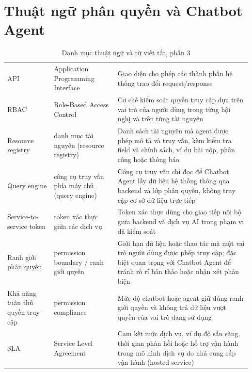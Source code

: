 \pagebreak

\section*{Thuật ngữ phân quyền và Chatbot Agent}

\begingroup
\setlength{\tabcolsep}{2pt}
\renewcommand{\arraystretch}{1.2}
\begin{longtable}{|C{0.16\textwidth}|P{0.22\textwidth}|P{0.55\textwidth}|}  \caption{Danh mục thuật ngữ và từ viết tắt, phần 3}\\
  \hline
       &        &     \\ \hline
  API     &     Application Programming Interface     &     Giao diện cho phép các thành phần hệ thống trao đổi request/response \\ \hline
  RBAC     &     Role-\allowbreak Based Access Control     &     Cơ chế kiểm soát quyền truy cập dựa trên vai trò của người dùng trong từng hội nghị và trên từng tài nguyên \\ \hline
  Resource registry      &      danh mục tài nguyên (resource registry)      &      Danh sách tài nguyên mà agent được phép mô tả và truy vấn, kèm kiểm tra field và chính sách, ví dụ bài nộp, phân công hoặc thông báo \\ \hline
  Query engine      &      công cụ truy vấn phía máy chủ (query engine)      &      Công cụ truy vấn chỉ đọc để Chatbot Agent lấy dữ liệu hệ thống thông qua backend và lớp phân quyền, không truy cập cơ sở dữ liệu trực tiếp \\ \hline
  Service-\allowbreak to-\allowbreak service token      &      token xác thực giữa các dịch vụ      &      Token xác thực dùng cho giao tiếp nội bộ giữa backend và dịch vụ AI trong phạm vi đã kiểm soát \\ \hline
  Ranh giới phân quyền     &     permission boundary / ranh giới quyền     &     Giới hạn dữ liệu hoặc thao tác mà một vai trò người dùng được phép truy cập; đặc biệt quan trọng với Chatbot Agent để tránh rò rỉ bản thảo hoặc nhận xét phản biện \\ \hline
  Khả năng tuân thủ quyền truy cập     &     permission compliance     &     Mức độ chatbot hoặc agent giữ đúng ranh giới quyền và không trả dữ liệu vượt quyền của vai trò đang sử dụng \\ \hline
  SLA      &      Service Level Agreement      &      Cam kết mức dịch vụ, ví dụ độ sẵn sàng, thời gian phản hồi hoặc hỗ trợ vận hành trong mô hình dịch vụ do nhà cung cấp vận hành (hosted service) \\ \hline
\end{longtable}
\endgroup

